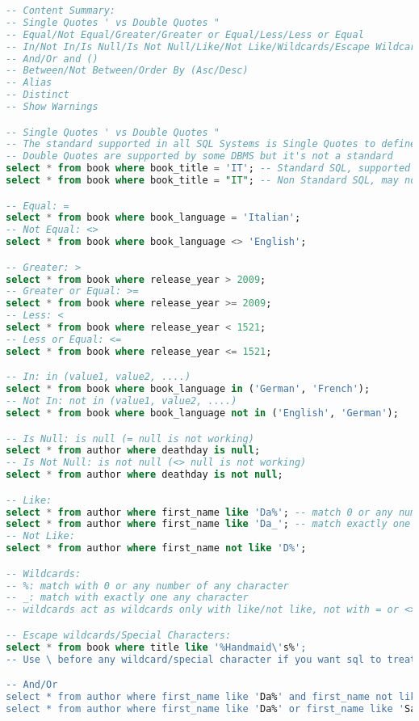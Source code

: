 \begin{lstlisting}[language=SQL]
-- Content Summary:
-- Single Quotes ' vs Double Quotes "
-- Equal/Not Equal/Greater/Greater or Equal/Less/Less or Equal
-- In/Not In/Is Null/Is Not Null/Like/Not Like/Wildcards/Escape Wildcards and Special Characters
-- And/Or and ()
-- Between/Not Between/Order By (Asc/Desc)
-- Alias
-- Distinct
-- Show Warnings

-- Single Quotes ' vs Double Quotes "
-- The standard supported in all SQL Systems is Single Quotes to define Strings
-- Double Quotes are supported by some DBMS but it's not a standard
select * from book where book_title = 'IT'; -- Standard SQL, supported by all DBMS
select * from book where book_title = "IT"; -- Non Standard SQL, may not work in some DBMS

-- Equal: =
select * from book where book_language = 'Italian';
-- Not Equal: <>
select * from book where book_language <> 'English';

-- Greater: >
select * from book where release_year > 2009;
-- Greater or Equal: >=
select * from book where release_year >= 2009;
-- Less: <
select * from book where release_year < 1521;
-- Less or Equal: <=
select * from book where release_year <= 1521;

-- In: in (value1, value2, ....)
select * from book where book_language in ('German', 'French');
-- Not In: not in (value1, value2, ....)
select * from book where book_language not in ('English', 'German');

-- Is Null: is null (= null is not working)
select * from author where deathday is null;
-- Is Not Null: is not null (<> null is not working)
select * from author where deathday is not null;

-- Like:
select * from author where first_name like 'Da%'; -- match 0 or any number of any characters
select * from author where first_name like 'Da_'; -- match exactly one any character
-- Not Like:
select * from author where first_name not like 'D%';

-- Wildcards:
-- %: match with 0 or any number of any character
-- _: match with exactly one any character
-- wildcards act as wildcards only with like/not like, not with = or <>

-- Escape wildcards/Special Characters:
select * from book where title like '%Handmaid\'s%';
-- Use \ before any wildcard/special character if you want sql to treat it as normal character

-- And/Or
select * from author where first_name like 'Da%' and first_name not like 'Da_';
select * from author where first_name like 'Da%' or first_name like 'Sa%';


\end{lstlisting}
